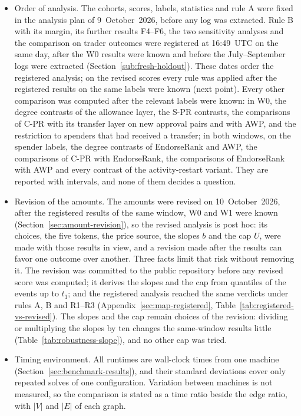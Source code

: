 \begin{itemize}
\item Order of analysis. The cohorts, scores, labels, statistics and rule A were fixed in the analysis plan of 9~October~2026, before any log was extracted. Rule B with its margin, its further results F4--F6, the two sensitivity analyses and the comparison on trader outcomes were registered at 16:49~UTC on the same day, after the W0 results were known and before the July--September logs were extracted (Section~\ref{sub:fresh-holdout}). These dates order the registered analysis; on the revised scores every rule was applied after the registered results on the same labels were known (next point). Every other comparison was computed after the relevant labels were known: in W0, the degree contrasts of the allowance layer, the S-PR contrasts, the comparisons of C-PR with its transfer layer on new approval pairs and with AWP, and the restriction to spenders that had received a transfer; in both windows, on the spender labels, the degree contrasts of EndorseRank and AWP, the comparisons of C-PR with EndorseRank, the comparisons of EndorseRank with AWP and every contrast of the activity-restart variant. They are reported with intervals, and none of them decides a question.
\item Revision of the amounts. The amounts were revised on 10~October~2026, after the registered results of the same window, W0 and W1 were known (Section~\ref{sec:amount-revision}), so the revised analysis is post hoc: its choices, the five tokens, the price source, the slopes $b$ and the cap $U$, were made with those results in view, and a revision made after the results can favor one outcome over another. Three facts limit that risk without removing it. The revision was committed to the public repository before any revised score was computed; it derives the slopes and the cap from quantiles of the events up to $t_1$; and the registered analysis reached the same verdicts under rules A, B and R1--R3 (Appendix~\ref{sec:map-registered}, Table~\ref{tab:registered-vs-revised}). The slopes and the cap remain choices of the revision: dividing or multiplying the slopes by ten changes the same-window results little (Table~\ref{tab:robustness-slope}), and no other cap was tried.
\item Timing environment. All runtimes are wall-clock times from one machine (Section~\ref{sec:benchmark-results}), and their standard deviations cover only repeated solves of one configuration. Variation between machines is not measured, so the comparison is stated as a time ratio beside the edge ratio, with $|V|$ and $|E|$ of each graph.
\end{itemize}

